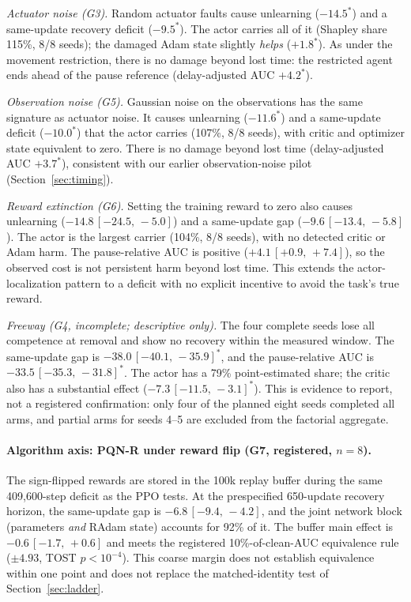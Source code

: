 \documentclass[10pt]{article} %
\newcommand{\sig}{^{\ast}}
\newcommand{\ci}[2]{\,[#1,\,#2]}
\begin{document}
\emph{Actuator noise (G3).} Random actuator faults cause unlearning ($-14.5\sig$) and a same-update recovery deficit ($-9.5\sig$). The actor carries all of it (Shapley share 115\%, 8/8 seeds); the damaged Adam state slightly \emph{helps} ($+1.8\sig$). As under the movement restriction, there is no damage beyond lost time: the restricted agent ends ahead of the pause reference (delay-adjusted AUC $+4.2\sig$).

\emph{Observation noise (G5).} Gaussian noise on the observations has the same signature as actuator noise. It causes unlearning ($-11.6\sig$) and a same-update deficit ($-10.0\sig$) that the actor carries (107\%, 8/8 seeds), with critic and optimizer state equivalent to zero. There is no damage beyond lost time (delay-adjusted AUC $+3.7\sig$), consistent with our earlier observation-noise pilot (Section~\ref{sec:timing}).

\emph{Reward extinction (G6).} Setting the training reward to zero also causes unlearning ($-14.8\ci{-24.5}{-5.0}$) and a same-update gap ($-9.6\ci{-13.4}{-5.8}$). The actor is the largest carrier (104\%, 8/8 seeds), with no detected critic or Adam harm. The pause-relative AUC is positive ($+4.1\ci{+0.9}{+7.4}$), so the observed cost is not persistent harm beyond lost time. This extends the actor-localization pattern to a deficit with no explicit incentive to avoid the task's true reward.

\emph{Freeway (G4, incomplete; descriptive only).} The four complete seeds lose all competence at removal and show no recovery within the measured window. The same-update gap is $-38.0\ci{-40.1}{-35.9}\sig$, and the pause-relative AUC is $-33.5\ci{-35.3}{-31.8}\sig$. The actor has a 79\% point-estimated share; the critic also has a substantial effect ($-7.3\ci{-11.5}{-3.1}\sig$). This is evidence to report, not a registered confirmation: only four of the planned eight seeds completed all arms, and partial arms for seeds 4--5 are excluded from the factorial aggregate.

\paragraph{Algorithm axis: PQN-R under reward flip (G7, registered, $n=8$).}
The sign-flipped rewards are stored in the 100k replay buffer during the same 409{,}600-step deficit as the PPO tests. At the prespecified 650-update recovery horizon, the same-update gap is $-6.8\ci{-9.4}{-4.2}$, and the joint network block (parameters \emph{and} RAdam state) accounts for 92\% of it. The buffer main effect is $-0.6\ci{-1.7}{+0.6}$ and meets the registered 10\%-of-clean-AUC equivalence rule ($\pm4.93$, TOST $p<10^{-4}$). This coarse margin does not establish equivalence within one point and does not replace the matched-identity test of Section~\ref{sec:ladder}.
\end{document}

